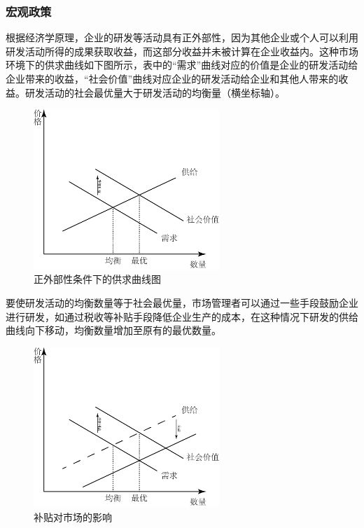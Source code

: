 \documentclass[twocolumn,openany]{ctexbook}
\begin{document}
			\subsubsection{宏观政策}
			
			根据经济学原理，企业的研发等活动具有正外部性，因为其他企业或个人可以利用研发活动所得的成果获取收益，而这部分收益并未被计算在企业收益内。这种市场环境下的供求曲线如下图所示，表中的“需求”曲线对应的价值是企业的研发活动给企业带来的收益，“社会价值”曲线对应企业的研发活动给企业和其他人带来的收益。研发活动的社会最优量大于研发活动的均衡量（横坐标轴）\citep{RN29}。
			\begin{figure}[ht]
				\centering
				\includegraphics[width=7cm]{fig5.png} %
				\caption{正外部性条件下的供求曲线图}
				\label{fig:fig5}
			\end{figure}
			
			要使研发活动的均衡数量等于社会最优量，市场管理者可以通过一些手段鼓励企业进行研发，如通过税收等补贴手段降低企业生产的成本，在这种情况下研发的供给曲线向下移动，均衡数量增加至原有的最优数量\citep{RN14}。
			
			\begin{figure}[ht]
				\centering
				\includegraphics[width=7cm]{fig6.png} %
				\caption{补贴对市场的影响}
				\label{fig:fig6}
			\end{figure}
			
\end{document}
